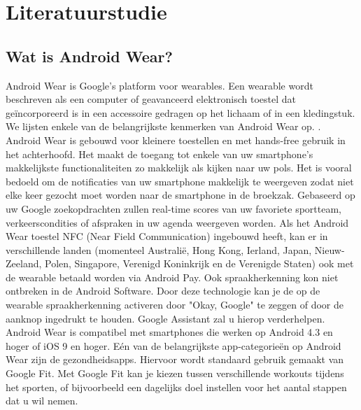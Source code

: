 
\chapter{Literatuurstudie}
\label{ch:literatuurstudie}

\section{Wat is Android Wear?}
\label{sec:androidwear}
Android Wear is Google's platform voor wearables. Een wearable wordt beschreven als een computer of geavanceerd elektronisch toestel dat geïncorporeerd is in een accessoire gedragen op het lichaam of in een kledingstuk. \autocite{Dictionary}
 We lijsten enkele van de  belangrijkste kenmerken van Android Wear op. \autocite{Techradar}.
Android Wear is gebouwd voor kleinere toestellen en met hands-free gebruik in het achterhoofd. Het maakt de toegang tot enkele van uw smartphone's makkelijkste functionaliteiten zo makkelijk als kijken naar uw pols. Het is vooral bedoeld om de notificaties van uw smartphone makkelijk te weergeven zodat niet elke keer gezocht moet worden naar de smartphone in de broekzak. Gebaseerd op uw Google zoekopdrachten zullen real-time scores van uw favoriete sportteam, verkeerscondities of afspraken in uw agenda weergeven worden. Als het Android Wear toestel NFC (Near Field Communication) ingebouwd heeft, kan er in verschillende landen (momenteel Australië, Hong Kong, Ierland, Japan, Nieuw-Zeeland, Polen, Singapore, Verenigd Koninkrijk en de Verenigde Staten) ook met de wearable betaald worden via Android Pay. \autocite{Androidpay} Ook spraakherkenning kon niet ontbreken in de Android Software. Door deze technologie kan je de op de wearable spraakherkenning activeren door "Okay, Google" te zeggen of door de aanknop ingedrukt te houden. Google Assistant zal u hierop verderhelpen. Android Wear is compatibel met smartphones die werken op Android 4.3 en hoger of iOS 9 en hoger. Eén van de belangrijkste app-categorieën op Android Wear zijn de gezondheidsapps. Hiervoor wordt standaard gebruik gemaakt van Google Fit. Met Google Fit kan je kiezen tussen verschillende workouts tijdens het sporten, of bijvoorbeeld een dagelijks doel instellen voor het aantal stappen dat u wil nemen.  
